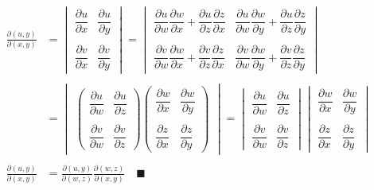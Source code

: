 \documentclass[../../Main.tex]{subfiles}
\begin{document}
\begin{align*}
    \frac{\partial (u,y)}{\partial (x,y)}&=\begin{vmatrix}
        \dfrac{\partial u}{\partial x} & \dfrac{\partial u}{\partial y}
        \\\\
        \dfrac{\partial v}{\partial x} & \dfrac{\partial v}{\partial y}
     \end{vmatrix}=
     \begin{vmatrix}
        \dfrac{\partial u}{\partial w} \dfrac{\partial w}{\partial x}+ \dfrac{\partial u}{\partial z} \dfrac{\partial z}{\partial x}  & \dfrac{\partial u}{\partial w}\dfrac{\partial w}{\partial y} + \dfrac{\partial u}{\partial z} \dfrac{\partial z}{\partial y}  
        \\\\
        \dfrac{\partial v}{\partial w}\dfrac{\partial w}{\partial x} + \dfrac{\partial v}{\partial z} \dfrac{\partial z}{\partial x}   & \dfrac{\partial v}{\partial w}\dfrac{\partial w}{\partial y} +\dfrac{\partial v}{\partial z} \dfrac{\partial z}{\partial y} 
     \end{vmatrix}   
     \\\\
     &=\begin{vmatrix}
        \begin{pmatrix}
            \dfrac{\partial u}{\partial w} & \dfrac{\partial u}{\partial z} 
            \\\\
            \dfrac{\partial v}{\partial w}  & \dfrac{\partial v}{\partial z} 
        \end{pmatrix}
        \begin{pmatrix}
            \dfrac{\partial w}{\partial x} & \dfrac{\partial w}{\partial y} 
            \\\\
            \dfrac{\partial z}{\partial x}  & \dfrac{\partial z}{\partial y} 
        \end{pmatrix}
     \end{vmatrix}=
     \begin{vmatrix}
        \dfrac{\partial u}{\partial w} & \dfrac{\partial u}{\partial z} 
        \\\\
        \dfrac{\partial v}{\partial w}  & \dfrac{\partial v}{\partial z} 
     \end{vmatrix}
     \begin{vmatrix}
        \dfrac{\partial w}{\partial x} & \dfrac{\partial w}{\partial y} 
        \\\\
        \dfrac{\partial z}{\partial x}  & \dfrac{\partial z}{\partial y} 
     \end{vmatrix}
     \\\\
     \frac{\partial (u,y)}{\partial (x,y)}&=\frac{\partial (u,y)}{\partial (w,z)}\frac{\partial (w,z)}{\partial (x,y)} \quad \blacksquare
\end{align*}
\end{document}
